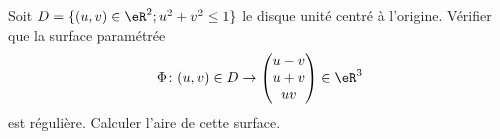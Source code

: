 
\begin{exercice}\label{exoOutilsMath-0123}

    Soit \( D=\{ (u,v)\in\eR^2;u^2+v^2\leq 1 \}\) le disque unité centré à l'origine. Vérifier que la surface paramétrée 
    \begin{equation}
        \Phi\colon (u,v)\in D\to \begin{pmatrix}
            u-v    \\ 
            u+v    \\ 
            uv    
        \end{pmatrix}\in\eR^3
    \end{equation}
    est régulière. Calculer l'aire de cette surface.

\end{exercice}
